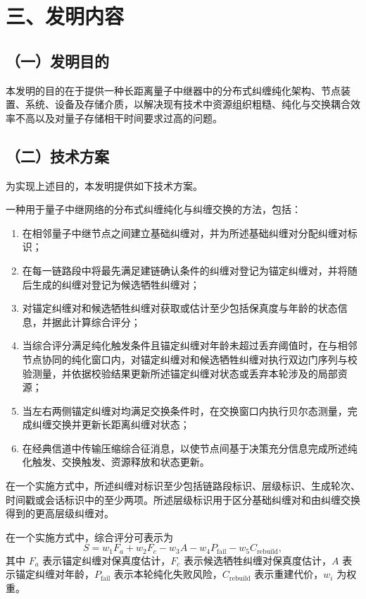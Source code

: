 \documentclass[12pt,a4paper]{article}
\begin{document}
\section*{三、发明内容}

\subsection*{（一）发明目的}

本发明的目的在于提供一种长距离量子中继器中的分布式纠缠纯化架构、节点装置、系统、设备及存储介质，以解决现有技术中资源组织粗糙、纯化与交换耦合效率不高以及对量子存储相干时间要求过高的问题。

\subsection*{（二）技术方案}

为实现上述目的，本发明提供如下技术方案。

一种用于量子中继网络的分布式纠缠纯化与纠缠交换的方法，包括：
\begin{enumerate}[leftmargin=2em]
    \item 在相邻量子中继节点之间建立基础纠缠对，并为所述基础纠缠对分配纠缠对标识；
    \item 在每一链路段中将最先满足建链确认条件的纠缠对登记为锚定纠缠对，并将随后生成的纠缠对登记为候选牺牲纠缠对；
    \item 对锚定纠缠对和候选牺牲纠缠对获取或估计至少包括保真度与年龄的状态信息，并据此计算综合评分；
    \item 当综合评分满足纯化触发条件且锚定纠缠对年龄未超过丢弃阈值时，在与相邻节点协同的纯化窗口内，对锚定纠缠对和候选牺牲纠缠对执行双边门序列与校验测量，并依据校验结果更新所述锚定纠缠对状态或丢弃本轮涉及的局部资源；
    \item 当左右两侧锚定纠缠对均满足交换条件时，在交换窗口内执行贝尔态测量，完成纠缠交换并更新长距离纠缠对状态；
    \item 在经典信道中传输压缩综合征消息，以使节点间基于决策充分信息完成所述纯化触发、交换触发、资源释放和状态更新。
\end{enumerate}

在一个实施方式中，所述纠缠对标识至少包括链路段标识、层级标识、生成轮次、时间戳或会话标识中的至少两项。所述层级标识用于区分基础纠缠对和由纠缠交换得到的更高层级纠缠对。

在一个实施方式中，综合评分可表示为
\[
S=w_1F_a+w_2F_c-w_3A-w_4P_{\mathrm{fail}}-w_5C_{\mathrm{rebuild}},
\]
其中 $F_a$ 表示锚定纠缠对保真度估计，$F_c$ 表示候选牺牲纠缠对保真度估计，$A$ 表示锚定纠缠对年龄，$P_{\mathrm{fail}}$ 表示本轮纯化失败风险，$C_{\mathrm{rebuild}}$ 表示重建代价，$w_i$ 为权重。
\end{document}
